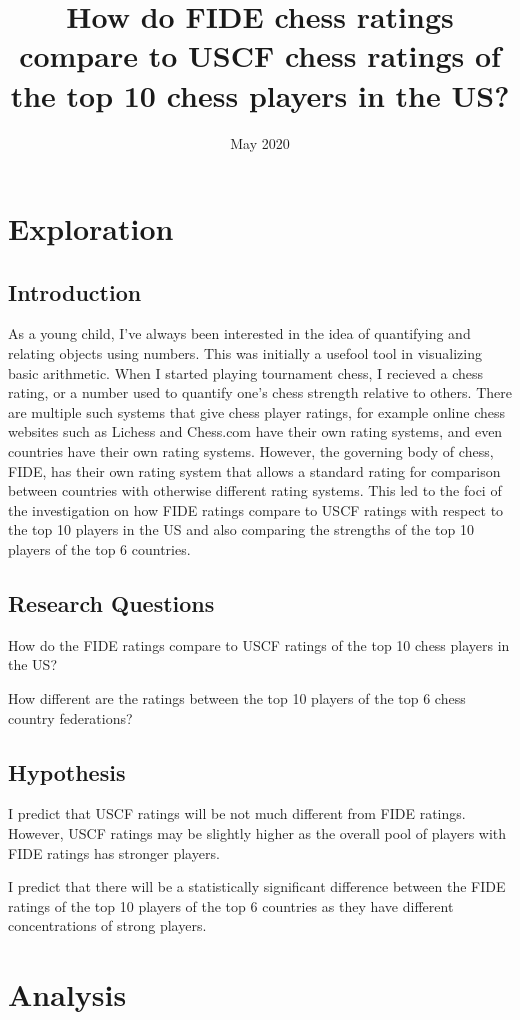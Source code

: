 \documentclass[12pt, titlepage]{article}
\title{\normalsize How do FIDE chess ratings compare to USCF chess ratings of the top 10 chess players in the US?}
\date{\normalsize May 2020}
\begin{document}
\maketitle
\tableofcontents
\newpage

\section{Exploration}
\subsection{Introduction}
As a young child, I've always been interested in the idea of quantifying and relating objects using numbers. This was initially a usefool tool in visualizing basic arithmetic. When I started playing tournament chess, I recieved a chess rating, or a number used to quantify one's chess strength relative to others. There are multiple such systems that give chess player ratings, for example online chess websites such as Lichess and Chess.com have their own rating systems, and even countries have their own rating systems. However, the governing body of chess, FIDE, has their own rating system that allows a standard rating for comparison between countries with otherwise different rating systems. This led to the foci of the investigation on how FIDE ratings compare to USCF ratings with respect to the top 10 players in the US and also comparing the strengths of the top 10 players of the top 6 countries.
\subsection{Research Questions}
How do the FIDE ratings compare to USCF ratings of the top 10 chess players in the US?

How different are the ratings between the top 10 players of the top 6 chess country federations?
\subsection{Hypothesis}
I predict that USCF ratings will be not much different from FIDE ratings. However, USCF ratings may be slightly higher as the overall pool of players with FIDE ratings has stronger players.

I predict that there will be a statistically significant difference between the FIDE ratings of the top 10 players of the top 6 countries as they have different concentrations of strong players. 

\section{Analysis}
\end{document}

